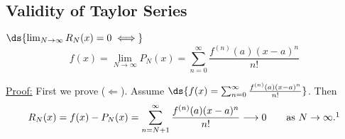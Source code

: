 \subsection{Validity of Taylor Series}

\begin{theorem}$\ds{\lim_{N\to\infty}R_N(x)=0\iff}$ 
\begin{equation}f(x)=\lim_{N\to\infty}P_N(x)
= \sum_{n=0}^\infty\frac{f^{(n)}(a)(x-a)^n}{n!}
\label{TaylorSeries}\end{equation} 
\end{theorem}

\underline{Proof:} First we prove ($\Longleftarrow$).  
Assume $\ds{f(x)=\sum_{n=0}^\infty
\frac{f^{(n)}(a)(x-a)^n}{n!}}$.  Then
$$R_N(x)=f(x)-P_N(x)
=\sum_{n=N+1}^\infty \frac{f^{(n)}(a)(x-a)^n}{n!}
\longrightarrow 0 \qquad\text{as }N\to\infty.\footnotemark$$  

